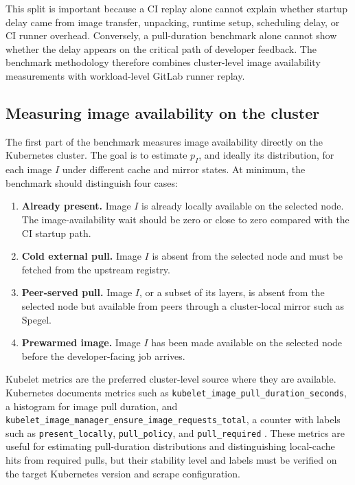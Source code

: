 \documentclass[11pt,a4paper]{article}
\begin{document}
This split is important because a CI replay alone cannot explain whether startup delay came from image transfer, unpacking, runtime setup, scheduling delay, or CI runner overhead. Conversely, a pull-duration benchmark alone cannot show whether the delay appears on the critical path of developer feedback. The benchmark methodology therefore combines cluster-level image availability measurements with workload-level GitLab runner replay.

\subsection{Measuring image availability on the cluster}

The first part of the benchmark measures image availability directly on the Kubernetes cluster. The goal is to estimate \(p_I\), and ideally its distribution, for each image \(I\) under different cache and mirror states. At minimum, the benchmark should distinguish four cases:

\begin{enumerate}[leftmargin=*]
\item \textbf{Already present.} Image \(I\) is already locally available on the selected node. The image-availability wait should be zero or close to zero compared with the CI startup path.
\item \textbf{Cold external pull.} Image \(I\) is absent from the selected node and must be fetched from the upstream registry.
\item \textbf{Peer-served pull.} Image \(I\), or a subset of its layers, is absent from the selected node but available from peers through a cluster-local mirror such as Spegel.
\item \textbf{Prewarmed image.} Image \(I\) has been made available on the selected node before the developer-facing job arrives.
\end{enumerate}

Kubelet metrics are the preferred cluster-level source where they are available. Kubernetes documents metrics such as \texttt{kubelet\_image\_pull\_duration\_seconds}, a histogram for image pull duration, and \texttt{kubelet\_image\_manager\_ensure\_image\_requests\_total}, a counter with labels such as \texttt{present\_locally}, \texttt{pull\_policy}, and \texttt{pull\_required} \cite{kubeletmetrics}. These metrics are useful for estimating pull-duration distributions and distinguishing local-cache hits from required pulls, but their stability level and labels must be verified on the target Kubernetes version and scrape configuration.
\end{document}
